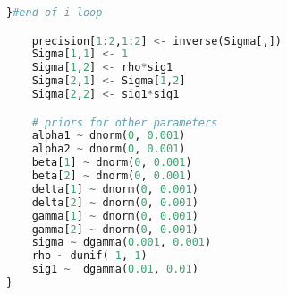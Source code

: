 \begin{appendices}
\begin{lstlisting}[language=python]
	}#end of i loop

	precision[1:2,1:2] <- inverse(Sigma[,])
	Sigma[1,1] <- 1
	Sigma[1,2] <- rho*sig1
	Sigma[2,1] <- Sigma[1,2]
	Sigma[2,2] <- sig1*sig1

	# priors for other parameters
	alpha1 ~ dnorm(0, 0.001)
	alpha2 ~ dnorm(0, 0.001)
	beta[1] ~ dnorm(0, 0.001)
	beta[2] ~ dnorm(0, 0.001)
	delta[1] ~ dnorm(0, 0.001)
	delta[2] ~ dnorm(0, 0.001)
	gamma[1] ~ dnorm(0, 0.001)
	gamma[2] ~ dnorm(0, 0.001)
	sigma ~ dgamma(0.001, 0.001)
	rho ~ dunif(-1, 1)
	sig1 ~  dgamma(0.01, 0.01)
}

\end{lstlisting}




\end{appendices}


%
%
% 


% 
